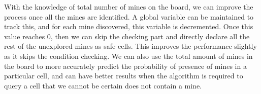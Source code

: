 \documentclass[a4paper]{article}
\begin{document}
With the knowledge of total number of mines on the board, we can improve the process once all the mines are identified. A global variable can be maintained to track this, and for each mine discovered, this variable is decremented. Once this value reaches 0, then we can skip the checking part and directly declare all the rest of the unexplored mines as safe cells. This improves the performance slightly as it skips the condition checking. We can also use the total amount of mines in the board to more accurately predict the probability of presence of mines in a particular cell, and can have better results when the algorithm is required to query a cell that we cannot be certain does not contain a mine.


\end{document}
